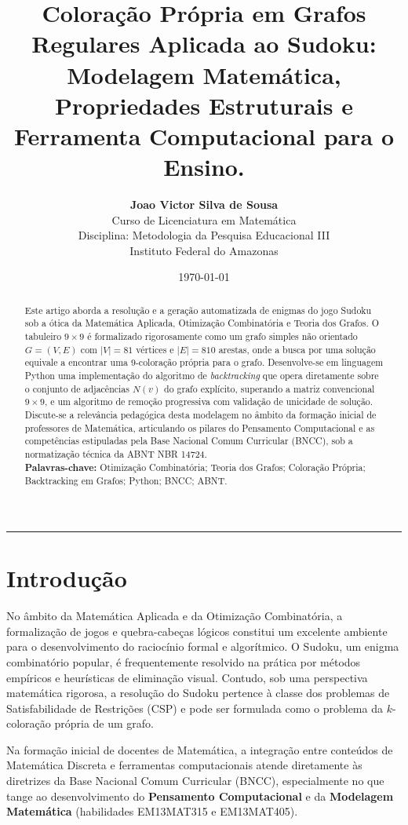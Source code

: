 \documentclass[12pt, a4paper]{article}
\title{\Large\bfseries \justifying Coloração Própria em Grafos Regulares Aplicada ao Sudoku: Modelagem Matemática, Propriedades Estruturais e Ferramenta Computacional para o Ensino.}
\author{\textbf{Joao Victor Silva de Sousa}\\[0.5em]
\small Curso de Licenciatura em Matemática\\
\small Disciplina: Metodologia da Pesquisa Educacional III\\
\small Instituto Federal do Amazonas}
\date{\today}
\begin{document}
\maketitle

\begin{abstract}
Este artigo aborda a resolução e a geração automatizada de enigmas do jogo Sudoku sob a ótica da Matemática Aplicada, Otimização Combinatória e Teoria dos Grafos. O tabuleiro $9 \times 9$ é formalizado rigorosamente como um grafo simples não orientado $G = (V, E)$ com $|V| = 81$ vértices e $|E| = 810$ arestas, onde a busca por uma solução equivale a encontrar uma $9$-coloração própria para o grafo. Desenvolve-se em linguagem Python uma implementação do algoritmo de \textit{backtracking} que opera diretamente sobre o conjunto de adjacências $N(v)$ do grafo explícito, superando a matriz convencional $9 \times 9$, e um algoritmo de remoção progressiva com validação de unicidade de solução. Discute-se a relevância pedagógica desta modelagem no âmbito da formação inicial de professores de Matemática, articulando os pilares do Pensamento Computacional e as competências estipuladas pela Base Nacional Comum Curricular (BNCC), sob a normatização técnica da ABNT NBR 14724.
\\[0.5em]
\textbf{Palavras-chave:} Otimização Combinatória; Teoria dos Grafos; Coloração Própria; Backtracking em Grafos; Python; BNCC; ABNT.
\end{abstract}

\vspace{1em}
\noindent\rule{\linewidth}{0.4pt}
\vspace{1.5em}

\section{Introdução}
No âmbito da Matemática Aplicada e da Otimização Combinatória, a formalização de jogos e quebra-cabeças lógicos constitui um excelente ambiente para o desenvolvimento do raciocínio formal e algorítmico. O Sudoku, um enigma combinatório popular, é frequentemente resolvido na prática por métodos empíricos e heurísticas de eliminação visual. Contudo, sob uma perspectiva matemática rigorosa, a resolução do Sudoku pertence à classe dos problemas de Satisfabilidade de Restrições (CSP) e pode ser formulada como o problema da $k$-coloração própria de um grafo.

Na formação inicial de docentes de Matemática, a integração entre conteúdos de Matemática Discreta e ferramentas computacionais atende diretamente às diretrizes da Base Nacional Comum Curricular (BNCC), especialmente no que tange ao desenvolvimento do \textbf{Pensamento Computacional} e da \textbf{Modelagem Matemática} (habilidades EM13MAT315 e EM13MAT405). 
\end{document}
